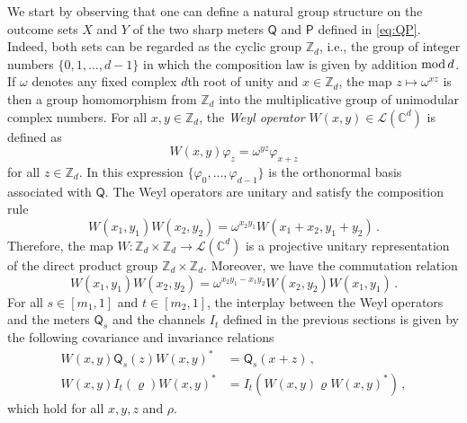 \documentclass[12pt,reqno]{amsart}
\theoremstyle{definition}
\newcommand{\Qo}{\mathsf{Q}}%
\newcommand{\Po}{\mathsf{P}}%
\newcommand{\rhoo}{\varrho} %
\newcommand{\phii}{\varphi} %
\newcommand{\Cb}{\mathbb{C}} %
\newcommand{\Zb}{\mathbb{Z}} %
\newcommand{\lc}[1]{\mathcal{L}(\Cb^{#1})} %
\begin{document}
We start by observing that one can define a natural group structure on the outcome sets $X$ and $Y$ of the two sharp meters $\Qo$ and $\Po$ defined in \eqref{eq:QP}. Indeed, both sets can be regarded as the cyclic group $\Zb_d$, i.e., the group of integer numbers $\{0,1,\ldots,d-1\}$ in which the composition law is given by addition ${\rm mod}\,d$. If $\omega$ denotes any fixed complex $d$th root of unity and $x\in\Zb_d$, the map $z\mapsto\omega^{xz}$ is then a group homomorphism from $\Zb_d$ into the multiplicative group of unimodular complex numbers. For all $x,y\in\Zb_d$, the {\em Weyl operator} $W(x,y)\in\lc{d}$ is defined as
\begin{equation} %
W(x,y)\phii_z = \omega^{yz} \phii_{x+z}
\end{equation}
for all $z\in\Zb_d$. In this expression $\{\phii_0,\ldots,\phii_{d-1}\}$ is the orthonormal basis associated with $\Qo$. The Weyl operators are unitary and satisfy the composition rule
$$
W(x_1,y_1)W(x_2,y_2) = \omega^{x_2 y_1} W(x_1 + x_2, y_1 + y_2) \,.
$$
Therefore, the map $W:\Zb_d\times\Zb_d\to\lc{d}$ is a projective unitary representation of the direct product group $\Zb_d\times\Zb_d$. Moreover, we have the commutation relation
$$
W(x_1,y_1)W(x_2,y_2) = \omega^{x_2 y_1 - x_1 y_2} W(x_2,y_2)W(x_1,y_1)\,.
$$
For all $s\in [m_1,1]$ and $t\in [m_2,1]$, the interplay between the Weyl operators and the meters $\Qo_s$ and the channels $I_t$ defined in the previous sections is given by the following covariance and invariance relations
\begin{align}
W(x,y)\Qo_s(z)W(x,y)^* & = \Qo_s(x+z)\,, \label{eq:cov_Qs}\\
W(x,y)I_t(\rhoo)W(x,y)^* & = I_t(W(x,y)\rhoo W(x,y)^*)\,, \label{eq:cov_It}
\end{align}
which hold for all $x,y,z$ and $\rho$.
\end{document}
